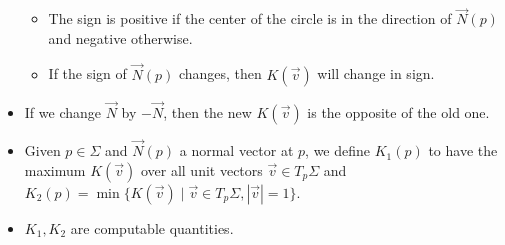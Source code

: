 \documentclass[../apprentice.tex]{subfiles}
\begin{document}
\begin{itemize}
    \begin{itemize}
        \item The sign is positive if the center of the circle is in the direction of $\vec{N}(p)$ and negative otherwise.
        \item If the sign of $\vec{N}(p)$ changes, then $K(\vec{v})$ will change in sign.
    \end{itemize}
    \item If we change $\vec{N}$ by $-\vec{N}$, then the new $K(\vec{v})$ is the opposite of the old one.
    \item Given $p\in\Sigma$ and $\vec{N}(p)$ a normal vector at $p$, we define $K_1(p)$ to have the maximum $K(\vec{v})$ over all unit vectors $\vec{v}\in T_p\Sigma$ and $K_2(p)=\min\{K(\vec{v})\mid \vec{v}\in T_p\Sigma,|\vec{v}|=1\}$.
    \item $K_1,K_2$ are computable quantities.
\end{itemize}
\end{document}
